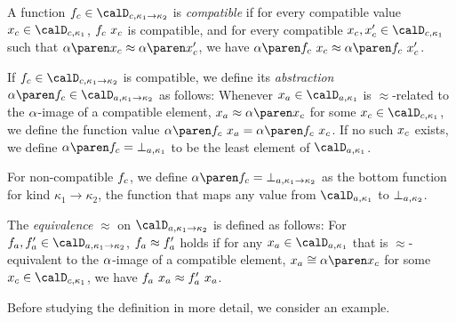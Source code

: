 \documentclass[../../diss.tex]{subfiles}
\begin{document}
\begin{definition}%
\label{Definition:HORSEFPTBasics}%
    \begin{thmenumerate}[(1)]%
        \item
            A function $\fc \in \domainc{\kappa_1 \to \kappa_2}$ is \emph{compatible} if for every compatible value $\xc \in \domainc{\kappa_1}$, $f_c \  x_c$ is compatible, and
                for every compatible $\xc, \xc' \in \domainc{\kappa_1}$ such that $\abs{\xc} \approx \abs{\xc'}$, we have $\abs{\fc \appl \xc} \approx \abs{\fc \appl \xc'}$.
        \item
            If $\fc  \in \domainc{\kappa_1 \to \kappa_2}$ is compatible, we define its \emph{abstraction} $\abs{\fc} \in \domaina{\kappa_1 \to \kappa_2}$ as follows:
            Whenever $\xa \in \domaina{\kappa_1}$ is $\approx$-related to the $\abs$-image of a compatible element, \ie $\xa \approx \abs{\xc}$ for some $\xc \in \domainc{\kappa_1}$, we define the function value $\abs{\fc} \appl \xa = \abs{\fc \appl \xc}$.
            If no such $x_c$ exists, we define $\abs{\fc} = \bota{\kappa_1}$ to be the least element of $\domaina{\kappa_1}$.

            For non-compatible $f_c$, we define $\abs{\fc} = \bota{\kappa_1 \to \kappa_2}$ as the bottom function for kind $\kappa_1 \to \kappa_2$, the function that maps any value from $\domaina{\kappa_1}$ to $\bota{\kappa_2}$.
        \item
            The \emph{equivalence} $\approx$ on $\domaina{\kappa_1 \to \kappa_2}$ is defined as follows: For $\fa, \fa' \in \domaina{\kappa_1 \to \kappa_2}$, $f_a \approx f_a'$ holds if for any $\xa \in \domaina{\kappa_1}$ that is $\approx$-equivalent to the $\abs$-image of a compatible element, $\xa \cong \abs{\xc}$ for some $\xc \in \domainc{\kappa_1}$, we have $f_a \  x_a \approx f_a' \  x_a$.
    \end{thmenumerate}
\end{definition}

Before studying the definition in more detail, we consider an example.
\end{document}
